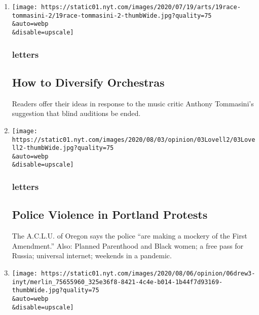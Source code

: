 \begin{enumerate}
\def\labelenumi{\arabic{enumi}.}
\item
  \href{/2020/08/08/opinion/letters/orchestras-race-diversity.html}{}

  \texttt{[image: https://static01.nyt.com/images/2020/07/19/arts/19race-tommasini-2/19race-tommasini-2-thumbWide.jpg?quality=75\\\&auto=webp\\\&disable=upscale]}

  \hypertarget{letters}{%
  \subsubsection{letters}\label{letters}}

  \hypertarget{how-to-diversify-orchestras}{%
  \subsection{How to Diversify
  Orchestras}\label{how-to-diversify-orchestras}}

  Readers offer their ideas in response to the music critic Anthony
  Tommasini's suggestion that blind auditions be ended.
\item
  \href{/2020/08/07/opinion/letters/portland-police.html}{}

  \texttt{[image: https://static01.nyt.com/images/2020/08/03/opinion/03Lovell2/03Lovell2-thumbWide.jpg?quality=75\\\&auto=webp\\\&disable=upscale]}

  \hypertarget{letters-1}{%
  \subsubsection{letters}\label{letters-1}}

  \hypertarget{police-violence-in-portland-protests}{%
  \subsection{Police Violence in Portland
  Protests}\label{police-violence-in-portland-protests}}

  The A.C.L.U. of Oregon says the police ``are making a mockery of the
  First Amendment.'' Also: Planned Parenthood and Black women; a free
  pass for Russia; universal internet; weekends in a pandemic.
\item
  \href{/2020/08/07/opinion/letters/presidential-debates.html}{}

  \texttt{[image: https://static01.nyt.com/images/2020/08/06/opinion/06drew3-inyt/merlin\_75655960\_325e36f8-8421-4c4e-b014-1b44f7d93169-thumbWide.jpg?quality=75\\\&auto=webp\\\&disable=upscale]}


\end{enumerate}
